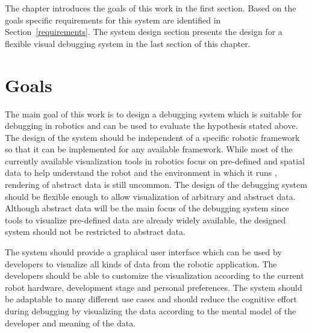 The chapter introduces the goals of this work in the first section. Based on the goals specific requirements for this system are identified in Section~\ref{requirements}. The system design section presents the design for a flexible visual debugging system in the last section of this chapter.






\section{Goals}
The main goal of this work is to design a debugging system which is suitable for debugging in robotics and can be used to evaluate the hypothesis stated above. The design of the system should be independent of a specific robotic framework so that it can be implemented for any available framework.
While most of the currently available visualization tools in robotics focus on pre-defined and spatial data to help understand the robot and the environment in which it runs \cite{Collett2010, Quigley2009}, rendering of abstract data is still uncommon. The design of the debugging system should be flexible enough to allow visualization of arbitrary and abstract data. Although abstract data will be the main focus of the debugging system since tools to visualize pre-defined data are already widely available, the designed system should not be restricted to abstract data.

The system should provide a graphical user interface which can be used by developers to visualize all kinds of data from the robotic application. The developers should be able to customize the visualization according to the current robot hardware, development stage and personal preferences. The system should be adaptable to many different use cases and should reduce the cognitive effort during debugging by visualizing the data according to the mental model of the developer and meaning of the data.

